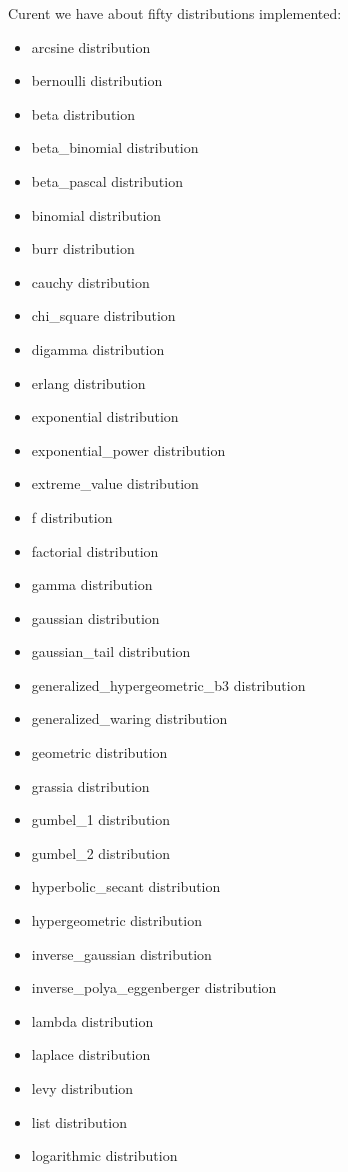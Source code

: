 Curent we have about fifty distributions implemented:
\begin{itemize}
    \item arcsine distribution
    \item bernoulli distribution
    \item beta distribution
    \item beta\_binomial distribution
    \item beta\_pascal distribution
    \item binomial distribution
    \item burr distribution
    \item cauchy distribution
    \item chi\_square distribution
    \item digamma distribution
    \item erlang distribution
    \item exponential distribution
    \item exponential\_power distribution
    \item extreme\_value distribution
    \item f distribution
    \item factorial distribution
    \item gamma distribution
    \item gaussian distribution
    \item gaussian\_tail distribution
    \item generalized\_hypergeometric\_b3 distribution
    \item generalized\_waring distribution
    \item geometric distribution
    \item grassia distribution
    \item gumbel\_1 distribution
    \item gumbel\_2 distribution
    \item hyperbolic\_secant distribution
    \item hypergeometric distribution
    \item inverse\_gaussian distribution
    \item inverse\_polya\_eggenberger distribution
    \item lambda distribution
    \item laplace distribution
    \item levy distribution
    \item list distribution
    \item logarithmic distribution

\end{itemize}
